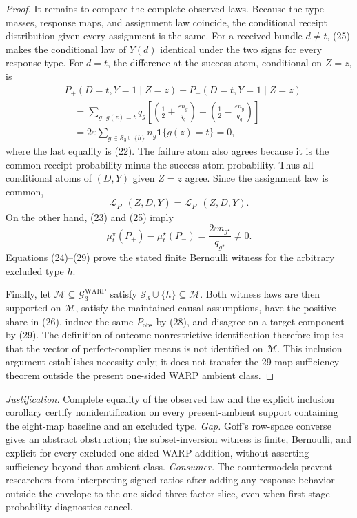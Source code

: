 \documentclass{article}
\begin{document}
\begin{proof}
It remains to compare the complete observed laws.  Because the type masses, response maps, and assignment law coincide, the conditional receipt distribution given every assignment is the same.  For a received bundle \(d\ne t\), (25) makes the conditional law of \(Y(d)\) identical under the two signs for every response type.  For \(d=t\), the difference at the success atom, conditional on \(Z=z\), is
\[
\begin{aligned}
&P_+(D=t,Y=1\mid Z=z)-P_-(D=t,Y=1\mid Z=z)\\
&\quad=\sum_{g:\,g(z)=t}q_g
\left[
\left(\frac12+\frac{\varepsilon n_g}{q_g}\right)
-\left(\frac12-\frac{\varepsilon n_g}{q_g}\right)
\right]\\
&\quad=2\varepsilon
\sum_{g\in\mathcal S_3\cup\{h\}}n_g\mathbf 1\{g(z)=t\}=0, \tag{27}
\end{aligned}
\]
where the last equality is (22).  The failure atom also agrees because it is the common receipt probability minus the success-atom probability.  Thus all conditional atoms of \((D,Y)\) given \(Z=z\) agree.  Since the assignment law is common,
\[
\mathcal L_{P_+}(Z,D,Y)=\mathcal L_{P_-}(Z,D,Y). \tag{28}
\]
On the other hand, (23) and (25) imply
\[
\mu_t^\star(P_+)-\mu_t^\star(P_-)
=\frac{2\varepsilon n_{g^\star}}{q_{g^\star}}
\ne0. \tag{29}
\]
Equations (24)--(29) prove the stated finite Bernoulli witness for the arbitrary excluded type \(h\).

Finally, let \(\mathcal M\subseteq\mathcal G^{\mathrm{WARP}}_3\) satisfy \(\mathcal S_3\cup\{h\}\subseteq\mathcal M\).  Both witness laws are then supported on \(\mathcal M\), satisfy the maintained causal assumptions, have the positive share in (26), induce the same \(P_{\mathrm{obs}}\) by (28), and disagree on a target component by (29).  The definition of outcome-nonrestrictive identification therefore implies that the vector of perfect-complier means is not identified on \(\mathcal M\).  This inclusion argument establishes necessity only; it does not transfer the 29-map sufficiency theorem outside the present one-sided WARP ambient class.
\end{proof}
\par\smallskip\noindent \textit{Justification.} Complete equality of the observed law and the explicit inclusion corollary certify nonidentification on every present-ambient support containing the eight-map baseline and an excluded type. \textit{Gap.} Goff's row-space converse gives an abstract obstruction; the subset-inversion witness is finite, Bernoulli, and explicit for every excluded one-sided WARP addition, without asserting sufficiency beyond that ambient class. \textit{Consumer.} The countermodels prevent researchers from interpreting signed ratios after adding any response behavior outside the envelope to the one-sided three-factor slice, even when first-stage probability diagnostics cancel.
\end{document}
